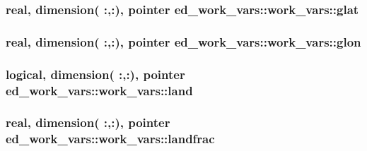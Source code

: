 \subsubsection[{glat}]{\setlength{\rightskip}{0pt plus 5cm}real, dimension(  \+:,\+:), pointer ed\+\_\+work\+\_\+vars\+::work\+\_\+vars\+::glat}\label{structed__work__vars_1_1work__vars_a5ecb409e79dce91a912a091c1e52c86f}
\hypertarget{structed__work__vars_1_1work__vars_a261b9c78feb96aa1ae5e2c7f3c05a14f}{}
\subsubsection[{glon}]{\setlength{\rightskip}{0pt plus 5cm}real, dimension(  \+:,\+:), pointer ed\+\_\+work\+\_\+vars\+::work\+\_\+vars\+::glon}\label{structed__work__vars_1_1work__vars_a261b9c78feb96aa1ae5e2c7f3c05a14f}
\hypertarget{structed__work__vars_1_1work__vars_a8fd4a40ea2044b6bcd7d1f6d9889eb7e}{}
\subsubsection[{land}]{\setlength{\rightskip}{0pt plus 5cm}logical, dimension(  \+:,\+:), pointer ed\+\_\+work\+\_\+vars\+::work\+\_\+vars\+::land}\label{structed__work__vars_1_1work__vars_a8fd4a40ea2044b6bcd7d1f6d9889eb7e}
\hypertarget{structed__work__vars_1_1work__vars_ab8f96bf658cca93060e2873175b5e01d}{}
\subsubsection[{landfrac}]{\setlength{\rightskip}{0pt plus 5cm}real, dimension(  \+:,\+:), pointer ed\+\_\+work\+\_\+vars\+::work\+\_\+vars\+::landfrac}\label{structed__work__vars_1_1work__vars_ab8f96bf658cca93060e2873175b5e01d}
\hypertarget{structed__work__vars_1_1work__vars_adf494eae72e0842302df97690e8f9258}{}
